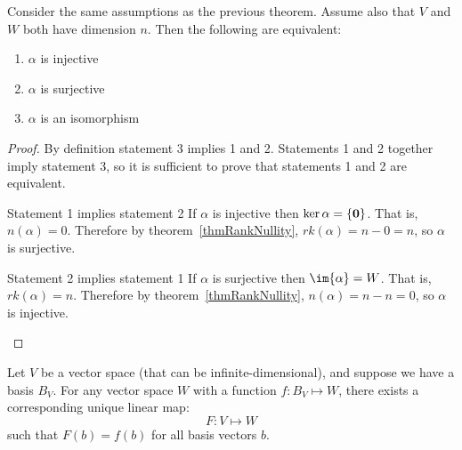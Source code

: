 \documentclass[../Main.tex]{subfiles}
\begin{document}
\begin{corollary}
    Consider the same assumptions as the previous theorem. Assume also that $V$ and $W$ both have dimension $n$. Then the following are equivalent:
    \begin{enumerate}
        \item $\alpha$ is injective
        \item $\alpha$ is surjective
        \item $\alpha$ is an isomorphism
    \end{enumerate}
    \label{corLinPidge}
\end{corollary}
\begin{proof}
    By definition statement 3 implies 1 and 2. Statements 1 and 2 together imply statement 3, so it is sufficient to prove that statements 1 and 2 are equivalent.

    \begin{subproof}{Statement 1 implies statement 2}
        If $\alpha$ is injective then $\ker{\alpha} = \{\boldsymbol{0}\}$. That is, $n(\alpha) = 0$. Therefore by theorem~\ref{thmRankNullity}, $rk(\alpha) = n-0 = n$, so $\alpha$ is surjective.
    \end{subproof}
    \begin{subproof}{Statement 2 implies statement 1}
        If $\alpha$ is surjective then $\im{\alpha} = W$. That is, $rk(\alpha) = n$. Therefore by theorem~\ref{thmRankNullity}, $n(\alpha) = n-n = 0$, so $\alpha$ is injective.
    \end{subproof}
\end{proof}
\begin{proposition}
    Let $V$ be a vector space (that can be infinite-dimensional), and suppose we have a basis $B_V$. For any vector space $W$ with a function $f : B_V \mapsto W$, there exists a corresponding unique linear map:
    \begin{equation*}
        F : V \mapsto W
    \end{equation*}
    such that $F(b) = f(b)$ for all basis vectors $b$.
    \label{propLinMapOfBasis}
\end{proposition}
\end{document}
